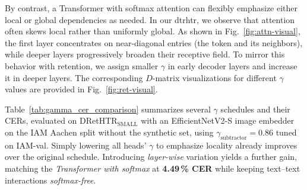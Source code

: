 \documentclass[times, review, 10pt]{elsarticle}
\begin{document}
By contrast, a Transformer with softmax attention can flexibly emphasize either local or global dependencies as needed. In our \ac{dtrhtr}, we observe that attention often skews local rather than uniformly global. As shown in Fig.~\ref{fig:attn-visual}, the first layer concentrates on near-diagonal entries (the token and its neighbors), while deeper layers progressively broaden their receptive field. To mirror this behavior with retention, we assign smaller $\gamma$ in early decoder layers and increase it in deeper layers. The corresponding $D$-matrix visualizations for different $\gamma$ values are provided in Fig.~\ref{fig:ret-visual}.

Table~\ref{tab:gamma_cer_comparison} summarizes several $\gamma$ schedules and their CERs, evaluated on DRetHTR$_{\text{SMALL}}$ with an EfficientNetV2-S image embedder on the IAM Aachen split without the synthetic set, using $\gamma_{\text{subtractor}}=0.86$ tuned on IAM-val. Simply lowering all heads’ $\gamma$ to emphasize locality already improves over the original schedule. Introducing \emph{layer-wise} variation yields a further gain, matching the \emph{Transformer with softmax} at \textbf{4.49\,\% CER} while keeping text–text interactions \emph{softmax-free}.






\end{document}
